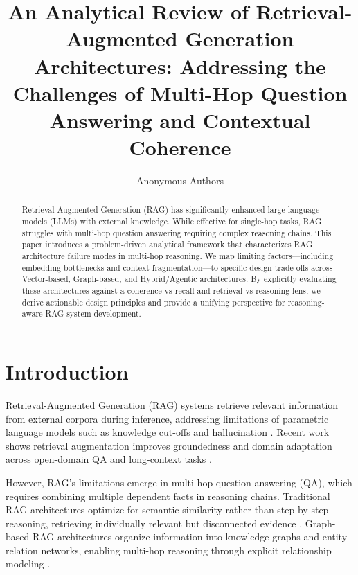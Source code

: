 \documentclass[runningheads]{llncs}
\begin{document}
\title{An Analytical Review of Retrieval-Augmented Generation Architectures: Addressing the Challenges of Multi-Hop Question Answering and Contextual Coherence}

\author{Anonymous Authors}



\maketitle

\begin{abstract}
Retrieval-Augmented Generation (RAG) has significantly enhanced large language models (LLMs) with external knowledge. While effective for single-hop tasks, RAG struggles with multi-hop question answering requiring complex reasoning chains. This paper introduces a problem-driven analytical framework that characterizes RAG architecture failure modes in multi-hop reasoning. We map limiting factors—including embedding bottlenecks and context fragmentation—to specific design trade-offs across Vector-based, Graph-based, and Hybrid/Agentic architectures. By explicitly evaluating these architectures against a coherence-vs-recall and retrieval-vs-reasoning lens, we derive actionable design principles and provide a unifying perspective for reasoning-aware RAG system development.
\end{abstract}


\section{Introduction}
Retrieval-Augmented Generation (RAG) systems retrieve relevant information from external corpora during inference, addressing limitations of parametric language models such as knowledge cut-offs and hallucination \cite{1,2}. Recent work shows retrieval augmentation improves groundedness and domain adaptation across open-domain QA and long-context tasks \cite{7,23,41}.

However, RAG's limitations emerge in multi-hop question answering (QA), which requires combining multiple dependent facts in reasoning chains. Traditional RAG architectures optimize for semantic similarity rather than step-by-step reasoning, retrieving individually relevant but disconnected evidence \cite{13,67}. Graph-based RAG architectures organize information into knowledge graphs and entity-relation networks, enabling multi-hop reasoning through explicit relationship modeling \cite{19,54}.
\end{document}
